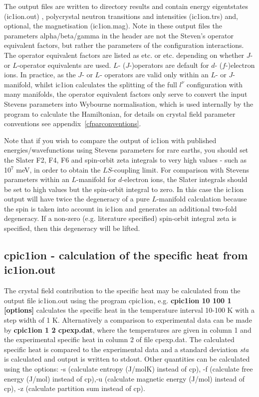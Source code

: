 The output files are written to directory {\prg results} and contain energy eigentstates ({\prg ic1ion.out}) ,
polycrystal neutron transitions and intensities ({\prg ic1ion.trs}) and, optional, %
the magnetisation ({\prg ic1ion.mag}). Note in these
output files the parameters alpha/beta/gamma
in the header are not the Steven's operator equivalent factors, but
rather the parameters of the configuration interactions. The operator equivalent factors are listed as 
{\tt <L||alpha||L>} etc. or {\tt <J||alpha||J>} etc. depending on whether $J$- or $L$-operator equivalents
are used. $L$- ($J$-)operators are default for $d$- ($f$-)electron ions. In practice, as the $J$- or $L$- 
operators are valid only within an $L$- or $J$-manifold, whilst {\prg ic1ion} calculates the splitting of the
full $l^\nu$ configuration with many manifolds, the operator equivalent factors only serve to convert the input
Stevens parameters into Wybourne normalisation, which is used internally by the program to calculate the
Hamiltonian, for details on crystal field parameter conventions see appendix~\ref{cfparconventions}.


Note that if you wish to compare the output of {\prg ic1ion} with published energies/wavefunctions using Stevens
parameters for rare earths, you should set the Slater {\prg F2, F4, F6} and spin-orbit {\prg zeta} integrals to
very high values - such as 10$^7$ meV, in order to obtain the $LS$-coupling limit. For comparison with Stevens
parameters within an $L$-manifold for $d$-electron ions, the Slater integrals should be set to high
values but the spin-orbit integral to zero. In this case the {\prg ic1ion} output will have twice the
degeneracy of a pure $L$-manifold calculation because the spin is taken into account in {\prg ic1ion} and
generates an additional two-fold degeneracy. If a non-zero (e.g. literature specified) spin-orbit integral
{\prg zeta} is specified, then this degeneracy will be lifted.

\subsection{{\prg cpic1ion} - calculation of the specific heat from {\prg ic1ion.out}}
 The crystal field contribution to the specific heat may be calculated 
from the output file {\prg ic1ion.out} using the  program {\prg cpic1ion}, e.g. {\bf cpic1ion 10 100 1 [options]}
calculates the specific heat in the temperature interval 10-100 K with a step width
of 1 K. Alternatively a comparison to experimental data can be made by {\bf cpic1ion 1 2 cpexp.dat},
where the temperatures are given in column 1 and the experimental specific heat in column
2 of file cpexp.dat. The calculated specific heat is compared to the experimental data and
a standard deviation {\em sta} is calculated and output is written to stdout.
Other quantities can be calculated using the options: -s  (calculate entropy  (J/molK) instead of cp),
-f (calculate free energy (J/mol) instead of cp),-u  (calculate magnetic energy (J/mol) instead of cp),
-z (calculate partition sum instead of cp).


